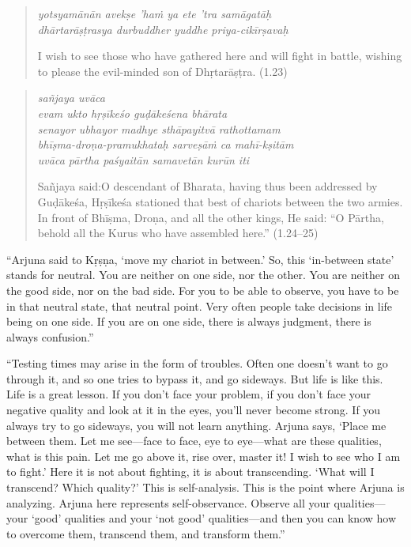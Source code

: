 \documentclass[12pt, twoside, openright]{memoir}
\begin{document}
\par
\begin{verse}
\textit{yotsyamānān avekṣe ’haṁ ya ete ’tra samāgatāḥ} \\
\textit{dhārtarāṣṭrasya durbuddher yuddhe priya-cikīrṣavaḥ}

\noindent I wish to see those who have gathered here and will fight in battle, wishing to please the evil-minded son of Dhṛtarāṣṭra. (1.23)
\end{verse}
\par



\par
\begin{verse}
\textit{sañjaya uvāca} \\
\textit{evam ukto hṛṣīkeśo guḍākeśena bhārata} \\
\textit{senayor ubhayor madhye sthāpayitvā rathottamam} \\
\textit{bhīṣma-droṇa-pramukhataḥ sarveṣāṁ ca mahī-kṣitām} \\
\textit{uvāca pārtha paśyaitān samavetān kurūn iti}

\noindent \quad Sañjaya said:\linebreak O descendant of Bharata, having thus been addressed by Guḍākeśa, Hṛṣīkeśa stationed that best of chariots between the two armies. In front of Bhīṣma, Droṇa, and all the other kings, He said: \enquote{O Pārtha, behold all the Kurus who have assembled here.} (1.24–25)
\end{verse}
\par


\enquote{Arjuna said to Kṛṣṇa, \enquote{move my chariot in between.} So, this \enquote{in-between state} stands for neutral. You are neither on one side, nor the other. You are neither on the good side, nor on the bad side. For you to be able to observe, you have to be in that neutral state, that neutral point. Very often people take decisions in life being on one side. If you are on one side, there is always judgment, there is always confusion.}

\enquote{Testing times may arise in the form of troubles. Often one doesn’t want to go through it, and so one tries to bypass it, and go sideways. But life is like this. Life is a great lesson. If you don’t face your problem, if you don’t face your negative quality and look at it in the eyes, you’ll never become strong. If you always try to go sideways, you will not learn anything. Arjuna says, \enquote{Place me between them. Let me see---face to face, eye to eye---what are these qualities, what is this pain. Let me go above it, rise over, master it! I wish to see who I am to fight.} Here it is not about fighting, it is about transcending. \enquote{What will I transcend? Which quality?} This is self-analysis. This is the point where Arjuna is analyzing. Arjuna here represents self-observance. Observe all your qualities---your \enquote{good} qualities and your \enquote{not good} qualities---and then you can know how to overcome them, transcend them, and transform them.}
\end{document}
